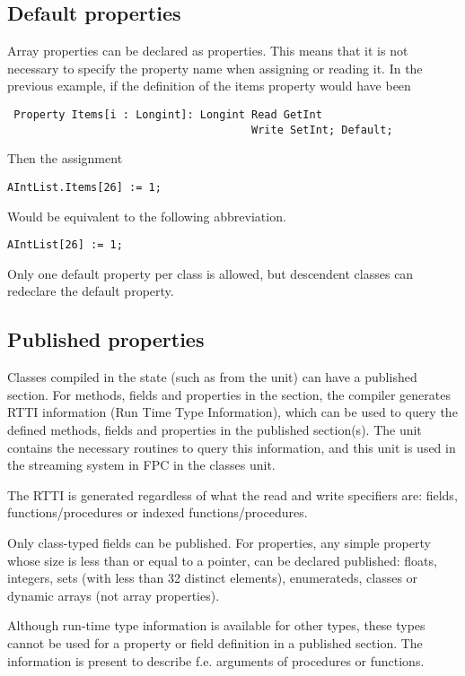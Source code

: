 \subsection{Default properties}
Array properties can be declared as  properties. This means that
it is not necessary to specify the property name when assigning or reading
it. In the previous example, if the definition of the items property would
have been
\begin{verbatim}
 Property Items[i : Longint]: Longint Read GetInt
                                      Write SetInt; Default;
\end{verbatim}
Then the assignment
\begin{verbatim}
AIntList.Items[26] := 1;
\end{verbatim}
Would be equivalent to the following abbreviation.
\begin{verbatim}
AIntList[26] := 1;
\end{verbatim}
Only one default property per class is allowed, but descendent classes
can redeclare the default property.

\subsection{Published properties}
Classes compiled in the  state (such as  from
the  unit) can have a published section. For methods, fields
and properties in the  section, the compiler generates RTTI
information (Run Time Type Information), which can be used to query the
defined methods, fields and properties in the published section(s). The
 unit contains the necessary routines to query this
information, and this unit is used in the streaming system in FPC in the
classes unit.

The RTTI is generated regardless of what the read and write specifiers are:
fields, functions/procedures or indexed functions/procedures.

Only class-typed fields can be published. For properties, any simple property
whose size is less than or equal to a pointer, can be declared published:
floats, integers, sets (with less than 32 distinct elements), enumerateds,
classes or dynamic arrays (not array properties).

Although run-time type information is available for other types, these types cannot
be used for a property or field definition in a published section. The
information is present to describe f.e. arguments of procedures or functions.

